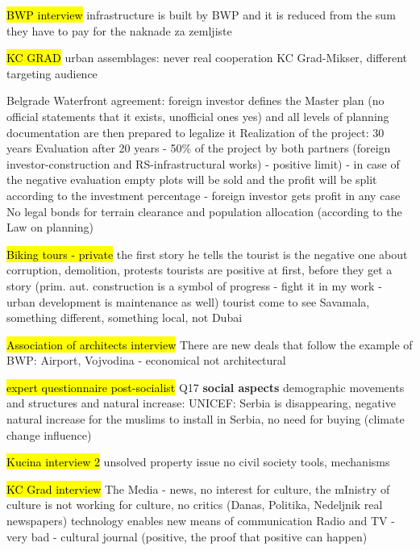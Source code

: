 \documentclass[11pt]{report}
\begin{document}
\hl{BWP interview}
infrastructure is built by BWP and it is reduced from the sum they have to pay for the naknade za zemljiste

\hl{KC GRAD}
urban assemblages: never real cooperation KC Grad-Mikser, different targeting audience

Belgrade Waterfront agreement:
foreign investor defines the Master plan (no official statements that it exists, unofficial ones yes) and all levels of planning documentation are then prepared to legalize it
Realization of the project: 30 years
Evaluation after 20 years - 50\% of the project by both partners (foreign investor-construction and RS-infrastructural works) - positive limit) - in case of the negative evaluation empty plots will be sold and the profit will be split according to the investment percentage - foreign investor gets profit in any case
No legal bonds for terrain clearance and population allocation (according to the Law on planning)

\hl{Biking tours - private}
the first story he tells the tourist is the negative one about corruption, demolition, protests
tourists are positive at first, before they get a story (prim. aut. construction is a symbol of progress - fight it in my work - urban development is maintenance as well)
tourist come to see Savamala, something different, something local, not Dubai

\hl{Association of architects interview}
There are new deals that follow the example of BWP: Airport, Vojvodina - economical not architectural

\hl{expert questionnaire post-socialist}
Q17
\textbf{social aspects}
demographic movements and structures
and natural increase:
UNICEF: Serbia is disappearing, negative natural increase
for the muslims to install in Serbia, no need for buying (climate change influence)

\hl{Kucina interview 2}
unsolved property issue
no civil society tools, mechanisms

\hl{KC Grad interview}
The Media - news, no interest for culture, the mInistry of culture is not working for culture, no critics (Danas, Politika, Nedeljnik real newspapers)
technology enables new means of communication
Radio and TV - very bad - cultural journal (positive, the proof that positive can happen)
\end{document}
